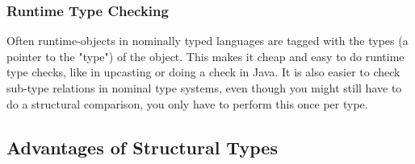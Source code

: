 %
%
%

\subsubsection{Runtime Type Checking}\label{subsubsec:runtime-type-checking}

Often runtime-objects in nominally typed languages are tagged with the types (a pointer to the "type") of the object.
This makes it cheap and easy to do runtime type checks, like in upcasting or doing a  check in Java.
It is also easier to check sub-type relations in nominal type systems, even though you might still have to do a structural comparison, you only have to perform this once per type.

\subsection{Advantages of Structural Types}\label{subsec:advantages-of-structural-types}

